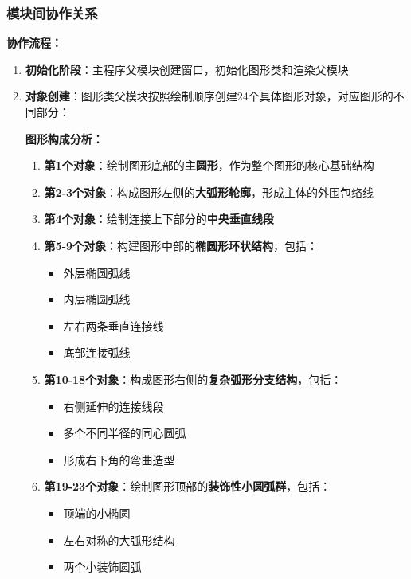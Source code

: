 \documentclass[12pt,a4paper]{article}
\begin{document}
\subsubsection{模块间协作关系}

\begin{tcolorbox}
\textbf{协作流程：}
\begin{enumerate}
    \item \textbf{初始化阶段}：主程序父模块创建窗口，初始化图形类和渲染父模块
    \item \textbf{对象创建}：图形类父模块按照绘制顺序创建24个具体图形对象，对应图形的不同部分：
    
    \textbf{图形构成分析：}
    \begin{enumerate}
        \item \textbf{第1个对象}：绘制图形底部的\textbf{主圆形}，作为整个图形的核心基础结构
        
        \item \textbf{第2-3个对象}：构成图形左侧的\textbf{大弧形轮廓}，形成主体的外围包络线
        
        \item \textbf{第4个对象}：绘制连接上下部分的\textbf{中央垂直线段}
        
        \item \textbf{第5-9个对象}：构建图形中部的\textbf{椭圆形环状结构}，包括：
        \begin{itemize}
            \item 外层椭圆弧线
            \item 内层椭圆弧线  
            \item 左右两条垂直连接线
            \item 底部连接弧线
        \end{itemize}
        
        \item \textbf{第10-18个对象}：构成图形右侧的\textbf{复杂弧形分支结构}，包括：
        \begin{itemize}
            \item 右侧延伸的连接线段
            \item 多个不同半径的同心圆弧
            \item 形成右下角的弯曲造型
        \end{itemize}
        
        \item \textbf{第19-23个对象}：绘制图形顶部的\textbf{装饰性小圆弧群}，包括：
        \begin{itemize}
            \item 顶端的小椭圆
            \item 左右对称的大弧形结构
            \item 两个小装饰圆弧
        \end{itemize}
        

\end{enumerate}
\end{enumerate}
\end{tcolorbox}
\end{document}
